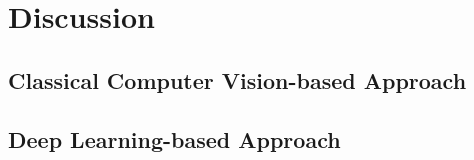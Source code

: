 \chapter{Discussion}

\section{Classical Computer Vision-based Approach}

\section{Deep Learning-based Approach}